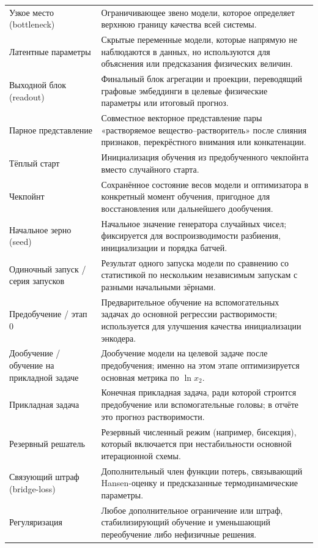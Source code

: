 \documentclass[11pt]{article}
\begin{document}
\begin{longtable}{p{}p{}}
Узкое место (bottleneck) & Ограничивающее звено модели, которое определяет верхнюю границу качества всей системы. \\
Латентные параметры & Скрытые переменные модели, которые напрямую не наблюдаются в данных, но используются для объяснения или предсказания физических величин. \\
Выходной блок (readout) & Финальный блок агрегации и проекции, переводящий графовые эмбеддинги в целевые физические параметры или итоговый прогноз. \\
Парное представление & Совместное векторное представление пары «растворяемое вещество--растворитель» после слияния признаков, перекрёстного внимания или конкатенации. \\
Тёплый старт & Инициализация обучения из предобученного чекпойнта вместо случайного старта. \\
Чекпойнт & Сохранённое состояние весов модели и оптимизатора в конкретный момент обучения, пригодное для восстановления или дальнейшего дообучения. \\
Начальное зерно (seed) & Начальное значение генератора случайных чисел; фиксируется для воспроизводимости разбиения, инициализации и порядка батчей. \\
Одиночный запуск / серия запусков & Результат одного запуска модели по сравнению со статистикой по нескольким независимым запускам с разными начальными зёрнами. \\
Предобучение / этап 0 & Предварительное обучение на вспомогательных задачах до основной регрессии растворимости; используется для улучшения качества инициализации энкодера. \\
Дообучение / обучение на прикладной задаче & Дообучение модели на целевой задаче после предобучения; именно на этом этапе оптимизируется основная метрика по $\ln x_2$. \\
Прикладная задача & Конечная прикладная задача, ради которой строится предобучение или вспомогательные головы; в отчёте это прогноз растворимости. \\
Резервный решатель & Резервный численный режим (например, бисекция), который включается при нестабильности основной итерационной схемы. \\
Связующий штраф (bridge-loss) & Дополнительный член функции потерь, связывающий Hansen-оценку и предсказанные термодинамические параметры. \\
Регуляризация & Любое дополнительное ограничение или штраф, стабилизирующий обучение и уменьшающий переобучение либо нефизичные решения. \\

\end{longtable}
\end{document}

